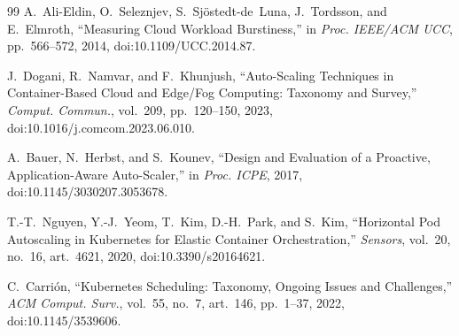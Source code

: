\documentclass[journal]{IEEEtran}
\begin{document}
\begin{thebibliography}{99}
A.~Ali-Eldin, O.~Seleznjev, S.~Sj\"ostedt-de~Luna, J.~Tordsson, and E.~Elmroth, ``Measuring Cloud Workload Burstiness,'' in \emph{Proc. IEEE/ACM UCC}, pp.~566--572, 2014, doi:10.1109/UCC.2014.87.

J.~Dogani, R.~Namvar, and F.~Khunjush, ``Auto-Scaling Techniques in Container-Based Cloud and Edge/Fog Computing: Taxonomy and Survey,'' \emph{Comput. Commun.}, vol.~209, pp.~120--150, 2023, doi:10.1016/j.comcom.2023.06.010.

A.~Bauer, N.~Herbst, and S.~Kounev, ``Design and Evaluation of a Proactive, Application-Aware Auto-Scaler,'' in \emph{Proc. ICPE}, 2017, doi:10.1145/3030207.3053678.

T.-T.~Nguyen, Y.-J.~Yeom, T.~Kim, D.-H.~Park, and S.~Kim, ``Horizontal Pod Autoscaling in Kubernetes for Elastic Container Orchestration,'' \emph{Sensors}, vol.~20, no.~16, art.~4621, 2020, doi:10.3390/s20164621.

C.~Carri\'on, ``Kubernetes Scheduling: Taxonomy, Ongoing Issues and Challenges,'' \emph{ACM Comput. Surv.}, vol.~55, no.~7, art.~146, pp.~1--37, 2022, doi:10.1145/3539606.

\end{thebibliography}
\end{document}
